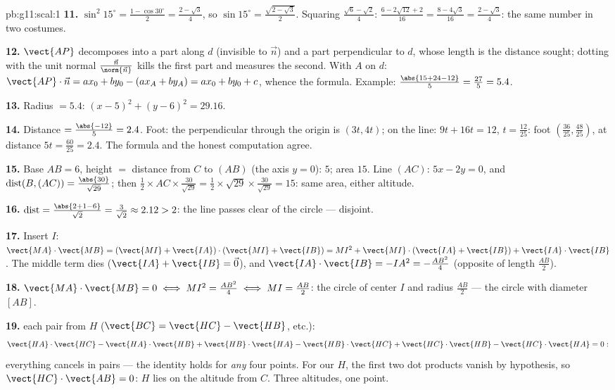 \begin{solution}{pb:g11:scal:1}
\textbf{11.} $\sin^2 15^\circ = \frac{1 - \cos 30^\circ}{2}
= \frac{2 - \sqrt3}{4}$, so
$\sin 15^\circ = \frac{\sqrt{2 - \sqrt3}}{2}$. Squaring
$\frac{\sqrt6 - \sqrt2}{4}$:
$\frac{6 - 2\sqrt{12} + 2}{16} = \frac{8 - 4\sqrt3}{16} =
\frac{2 - \sqrt3}{4}$: the same number in two costumes.

\textbf{12.} $\vect{AP}$ decomposes into a part along $d$
(invisible to $\vec n$) and a part perpendicular to $d$, whose
length is the distance sought; dotting with the unit normal
$\frac{\vec n}{\norm{\vec n}}$ kills the first part and
measures the second. With $A$ on $d$:
$\vect{AP} \cdot \vec n = a x_0 + b y_0 - (a x_A + b y_A) =
a x_0 + b y_0 + c$, whence the formula. Example:
$\frac{\abs{15 + 24 - 12}}{5} = \frac{27}{5} = 5.4$.

\textbf{13.} Radius $= 5.4$:
$(x - 5)^2 + (y - 6)^2 = 29.16$.

\textbf{14.} Distance $= \frac{\abs{-12}}{5} = 2.4$. Foot: the
perpendicular through the origin is $(3t, 4t)$; on the line:
$9t + 16t = 12$, $t = \frac{12}{25}$: foot
$\left(\frac{36}{25}, \frac{48}{25}\right)$, at distance
$5t = \frac{60}{25} = 2.4$. The formula and the honest
computation agree.

\textbf{15.} Base $AB = 6$, height $=$ distance from $C$ to
$(AB)$ (the axis $y = 0$): $5$; area $15$. Line $(AC)$:
$5x - 2y = 0$, and
$\operatorname{dist}(B, (AC)) = \frac{\abs{30}}{\sqrt{29}}$;
then $\frac12 \times AC \times \frac{30}{\sqrt{29}} =
\frac12 \times \sqrt{29} \times \frac{30}{\sqrt{29}} = 15$:
same area, either altitude.

\textbf{16.} $\operatorname{dist} = \frac{\abs{2 + 1 - 6}}
{\sqrt2} = \frac{3}{\sqrt2} \approx 2.12 > 2$: the line passes
clear of the circle --- disjoint.

\textbf{17.} Insert $I$:
$\vect{MA} \cdot \vect{MB} = (\vect{MI} + \vect{IA}) \cdot
(\vect{MI} + \vect{IB}) = MI^2 + \vect{MI} \cdot (\vect{IA} +
\vect{IB}) + \vect{IA} \cdot \vect{IB}$. The middle term dies
($\vect{IA} + \vect{IB} = \vec 0$), and
$\vect{IA} \cdot \vect{IB} = -IA^2 = -\frac{AB^2}{4}$
(opposite  of length $\frac{AB}2$).

\textbf{18.} $\vect{MA} \cdot \vect{MB} = 0 \iff MI^2 =
\frac{AB^2}{4} \iff MI = \frac{AB}{2}$: the circle of center
$I$ and radius $\frac{AB}2$ --- the circle with diameter
$[AB]$.

\textbf{19.}  each pair from $H$ ($\vect{BC} =
\vect{HC} - \vect{HB}$, etc.):
\[
\vect{HA} \cdot \vect{HC} - \vect{HA} \cdot \vect{HB}
+ \vect{HB} \cdot \vect{HA} - \vect{HB} \cdot \vect{HC}
+ \vect{HC} \cdot \vect{HB} - \vect{HC} \cdot \vect{HA} = 0 :
\]
everything cancels in pairs --- the identity holds for
\emph{any} four points. For our $H$, the first two dot
products vanish by hypothesis, so
$\vect{HC} \cdot \vect{AB} = 0$: $H$ lies on the altitude from
$C$. Three altitudes, one point.


\end{solution}
